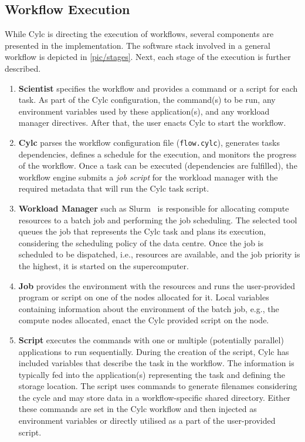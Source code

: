 \documentclass{superfri}
\begin{document}
\subsection{Workflow Execution}

While Cylc is directing the execution of workflows, several components are presented in the implementation.
The software stack involved in a general workflow is depicted in \cref{pic/stages}.
Next, each stage of the execution is further described.


\begin{enumerate}

  \item \textbf{Scientist} specifies the workflow and provides a command or a script for each task.
  As part of the Cylc configuration, the command(s) to be run, any environment variables used by these application(s), and any workload manager directives.
  After that, the user enacts Cylc to start the workflow.

  \item \textbf{Cylc} parses the workflow configuration file (\texttt{flow.cylc}), generates tasks dependencies, defines a schedule for the execution, and monitors the progress of the workflow.
  Once a task can be executed (dependencies are fulfilled), the workflow engine submits a \textit{job script} for the workload manager with the required metadata that will run the Cylc task script.

  \item \textbf{Workload Manager} such as Slurm~\cite{Jette02slurm:simple} is responsible for allocating compute resources to a batch job and performing the job scheduling.
  The selected tool queues the job that represents the Cylc task and plans its execution, considering the scheduling policy of the data centre.
  Once the job is scheduled to be dispatched, i.e., resources are available, and the job priority is the highest, it is started on the supercomputer.

  \item \textbf{Job} provides the environment with the resources and runs the user-provided program or script on one of the nodes allocated for it.
  Local variables containing information about the environment of the batch job, e.g., the compute nodes allocated, enact the Cylc provided script on the node.

  \item \textbf{Script} executes the commands with one or multiple (potentially parallel) applications to run sequentially.
  During the creation of the script, Cylc has included variables that describe the task in the workflow.
  The information is typically fed into the application(s) representing the task and defining the storage location.
  The script uses commands to generate filenames considering the cycle and may store data in a workflow-specific shared directory.
  Either these commands are set in the Cylc workflow and then injected as environment variables or directly utilised as a part of the user-provided script.


\end{enumerate}
\end{document}
